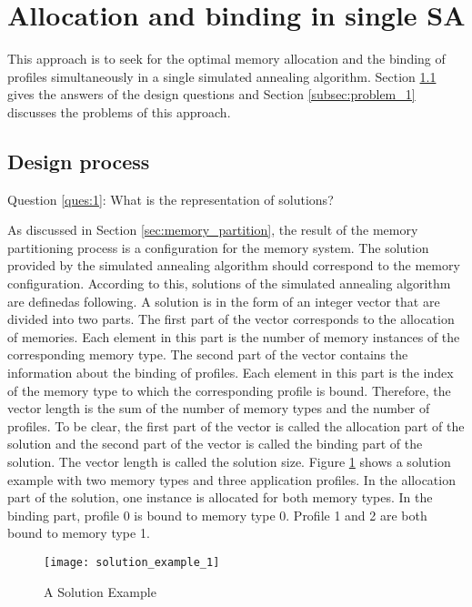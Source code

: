 	\section{Allocation and binding in single SA}
	\label{sec:stage_1}
	This approach is to seek for the optimal memory allocation and the
	binding of profiles simultaneously in a single simulated annealing
	algorithm.
	Section \ref{subsec:design_1} gives the answers of the design
	questions and Section \ref{subsec:problem_1} discusses the
	problems of this approach.
		\subsection{Design process}
		\label{subsec:design_1}
		Question \ref{ques:1}: What is the representation of solutions?
		
		As discussed in Section \ref{sec:memory_partition}, the result of the memory
		partitioning process is a configuration for the memory system.
		The solution provided by the simulated annealing algorithm should correspond
		to the memory configuration. According to this, solutions of the simulated
		annealing algorithm are definedas following.
		A solution is in the form of an integer vector that are divided
		into two parts. The first part of the vector corresponds to the allocation
		of memories.
		Each element in this part is the number of memory instances of the corresponding
		memory type.
		The second part of the vector contains the information about the binding of profiles.
		Each element in this part is the index of the memory type to which the corresponding
		profile is bound.
		Therefore, the vector length is the sum of the number of memory types and the
		number of profiles.
		To be clear, the first part of the vector is called the allocation part of
		the solution and the second part of the vector is called the binding part
		of the solution. The vector length is called the solution size.
		Figure \ref{fig:solu_exam_1} shows a solution example with two memory types and
		three application profiles.
		In the allocation part of the solution, one instance is allocated for both
		memory types.
		In the binding part, profile 0 is bound to memory type 0.
		Profile 1 and 2 are both bound to memory type 1.
		\begin{figure}[h]
			\begin{center}
				\texttt{[image: solution\_example\_1]}
				\caption{A Solution Example}
				\label{fig:solu_exam_1}
			\end{center}
		\end{figure}

